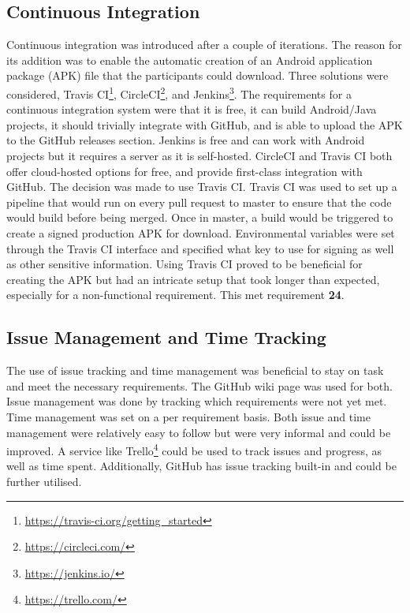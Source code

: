 \documentclass{l4proj}
\begin{document}
\subsection{Continuous Integration}
Continuous integration was introduced after a couple of iterations. The reason for its addition was to enable the automatic creation of an Android application package (APK) file that the participants could download. Three solutions were considered, Travis CI\footnote{\url{https://travis-ci.org/getting_started}}, CircleCI\footnote{\url{https://circleci.com/}}, and Jenkins\footnote{\url{https://jenkins.io/}}. The requirements for a continuous integration system were that it is free, it can build Android/Java projects, it should trivially integrate with GitHub, and is able to upload the APK to the GitHub releases section. Jenkins is free and can work with Android projects but it requires a server as it is self-hosted. CircleCI and Travis CI both offer cloud-hosted options for free, and provide first-class integration with GitHub. The decision was made to use Travis CI.  Travis CI was used to set up a pipeline that would run on every pull request to master to ensure that the code would build before being merged. Once in master, a build would be triggered to create a signed production APK for download. Environmental variables were set through the Travis CI interface and specified what key to use for signing as well as other sensitive information. Using Travis CI proved to be beneficial for creating the APK but had an intricate setup that took longer than expected, especially for a non-functional requirement. This met requirement \textbf{24}.


\subsection{Issue Management and Time Tracking}
The use of issue tracking and time management was beneficial to stay on task and meet the necessary requirements. The GitHub wiki page was used for both. Issue management was done by tracking which requirements were not yet met. Time management was set on a per requirement basis. Both issue and time management were relatively easy to follow but were very informal and could be improved. A service like Trello\footnote{\url{https://trello.com/}} could be used to track issues and progress, as well as time spent. Additionally, GitHub has issue tracking built-in and could be further utilised.
\end{document}
